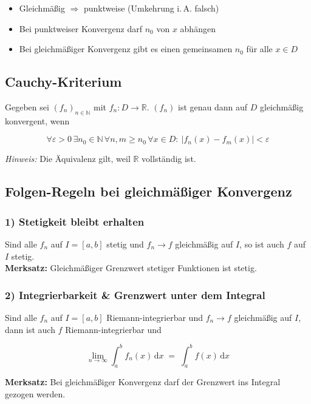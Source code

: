 \documentclass[a4paper,11pt,oneside,open=any,parskip=half, DIV=15]{scrreprt}
\begin{document}
      \begin{itemize}
         \item Gleichmäßig \(\Rightarrow\) punktweise (Umkehrung i.\,A. falsch)
         \item Bei punktweiser Konvergenz darf \(n_0\) von \(x\) abhängen
         \item Bei gleichmäßiger Konvergenz gibt es einen gemeinsamen \(n_0\) für alle \(x\in D\)
      \end{itemize}

   \subsection*{Cauchy\mbox{-}Kriterium}

      Gegeben sei \((f_n)_{n\in\mathbb{N}}\) mit \(f_n:D\to\mathbb{R}\).
      \((f_n)\) ist genau dann auf \(D\) gleichmäßig konvergent, wenn
      \begin{importantbox}
      \[
         \forall \varepsilon>0\,\exists n_0\in\mathbb{N}\,\forall n,m\ge n_0\,\forall x\in D:
         \ |f_n(x)-f_m(x)|<\varepsilon
      \]
      \end{importantbox}
      \emph{Hinweis:} Die Äquivalenz gilt, weil \(\mathbb{R}\) vollständig ist.

   \subsection*{Folgen\mbox{-}Regeln bei gleichmäßiger Konvergenz}

      \subsubsection*{1) Stetigkeit bleibt erhalten}  %
         Sind alle \(f_n\) auf \(I=[a,b]\) stetig und \(f_n\to f\) gleichmäßig auf \(I\),
         so ist auch \(f\) auf \(I\) stetig.\\
         \textbf{Merksatz:} Gleichmäßiger Grenzwert stetiger Funktionen ist stetig.

      \subsubsection*{2) Integrierbarkeit \& Grenzwert unter dem Integral} %
         Sind alle \(f_n\) auf \(I=[a,b]\) Riemann-integrierbar und \(f_n\to f\) gleichmäßig auf \(I\),
         dann ist auch \(f\) Riemann-integrierbar und
         \begin{importantbox}
            \[
               \lim_{n\to\infty}\int_a^b f_n(x)\,\mathrm{d}x\;=\;\int_a^b f(x)\,\mathrm{d}x
            \]
         \end{importantbox}
         \textbf{Merksatz:} Bei gleichmäßiger Konvergenz darf der Grenzwert ins Integral gezogen werden.
\end{document}
